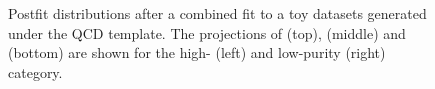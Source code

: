 \begin{figure}[h!]
\caption{Postfit distributions after a combined fit to a toy datasets generated under the QCD  template. The projections of \MJO (top), \MJT (middle) and \MVV (bottom) are shown for the high- (left) and low-purity (right) category.}
\label{fig:postfitPythia}
\end{figure}
\begin{figure}[h!]
\centering
{}
\\

\end{figure}
